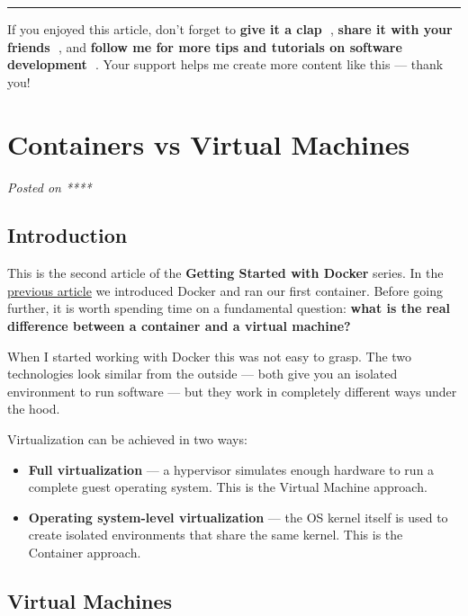 \documentclass[11pt,american,a4paper,openany]{book}
\providecommand{\tightlist}{%
  \setlength{\itemsep}{2pt}\setlength{\parskip}{0pt}}
\begin{document}
\begin{center}\rule{0.5\linewidth}{0.5pt}\end{center}

If you enjoyed this article, don't forget to \textbf{give it a clap 👏},
\textbf{share it with your friends 🔗}, and \textbf{follow me for more
tips and tutorials on software development 📘}. Your support helps me
create more content like this --- thank you! 🙌

\section{Containers vs Virtual
Machines}\label{containers-vs-virtual-machines}

\emph{Posted on ****}

\subsection{Introduction}\label{introduction-1}

This is the second article of the \textbf{Getting Started with Docker}
series. In the
\href{/Users/sasadangelo/github.com/sasadangelo/code4projects/getting-started-with-docker-2025/}{previous
article} we introduced Docker and ran our first container. Before going
further, it is worth spending time on a fundamental question:
\textbf{what is the real difference between a container and a virtual
machine?}

When I started working with Docker this was not easy to grasp. The two
technologies look similar from the outside --- both give you an isolated
environment to run software --- but they work in completely different
ways under the hood.

Virtualization can be achieved in two ways:

\begin{itemize}
\tightlist
\item
  \textbf{Full virtualization} --- a hypervisor simulates enough
  hardware to run a complete guest operating system. This is the Virtual
  Machine approach.
\item
  \textbf{Operating system-level virtualization} --- the OS kernel
  itself is used to create isolated environments that share the same
  kernel. This is the Container approach.
\end{itemize}

\subsection{Virtual Machines}\label{virtual-machines}
\end{document}
